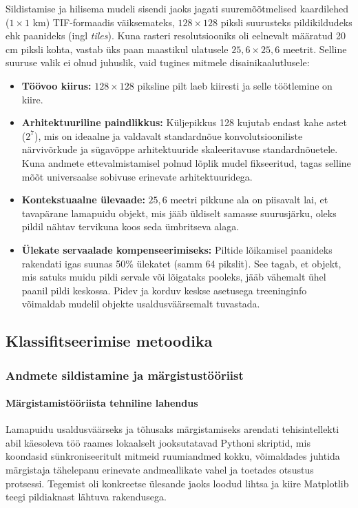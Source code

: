     Sildistamise ja hilisema mudeli sisendi jaoks jagati suuremõõtmelised kaardilehed ($1 \times 1$ km) TIF-formaadis väiksemateks, $128 \times 128$ piksli suurusteks pildikildudeks ehk paanideks (ingl \textit{tiles}). Kuna rasteri resolutsiooniks oli eelnevalt määratud 20 cm piksli kohta, vastab üks paan maastikul ulatusele $25,6 \times 25,6$ meetrit. Selline suuruse valik ei olnud juhuslik, vaid tugines mitmele disainikaalutlusele:
    \begin{itemize}
        \item \textbf{Töövoo kiirus:} $128 \times 128$ piksline pilt laeb kiiresti ja selle töötlemine on kiire.
        \item \textbf{Arhitektuuriline paindlikkus:} Küljepikkus 128 kujutab endast kahe astet ($2^7$), mis on ideaalne ja valdavalt standardnõue konvolutsiooniliste närvivõrkude ja sügavõppe arhitektuuride skaleeritavuse standardnõuetele. Kuna andmete ettevalmistamisel polnud lõplik mudel fikseeritud, tagas selline mõõt universaalse sobivuse erinevate arhitektuuridega.
        \item \textbf{Kontekstuaalne ülevaade:} $25,6$ meetri pikkune ala on piisavalt lai, et tavapärane lamapuidu objekt, mis jääb üldiselt samasse suurusjärku, oleks pildil nähtav tervikuna koos seda ümbritseva alaga.
        \item \textbf{Ülekate servaalade kompenseerimiseks:} Piltide lõikamisel paanideks rakendati igas suunas 50\% ülekatet (samm 64 pikslit). See tagab, et objekt, mis satuks muidu pildi servale või lõigataks pooleks, jääb vähemalt ühel paanil pildi keskossa. Pidev ja korduv keskse asetusega treeninginfo võimaldab mudelil objekte usaldusväärsemalt tuvastada.
    \end{itemize}


\subsection{Klassifitseerimise metoodika}
\label{subsec:metoodika-klassifitseerimine}

    \subsubsection{Andmete sildistamine ja märgistustööriist}
    \paragraph{Märgistamistööriista tehniline lahendus} Lamapuidu usaldusväärseks ja tõhusaks märgistamiseks arendati tehisintellekti abil käesoleva töö raames lokaalselt jooksutatavad Pythoni skriptid, mis koondasid sünkroniseeritult mitmeid ruumiandmed kokku, võimaldades juhtida märgistaja tähelepanu erinevate andmeallikate vahel ja toetades otsustus protsessi. Tegemist oli konkreetse ülesande jaoks loodud lihtsa ja kiire Matplotlib teegi pildiaknast lähtuva rakendusega.

